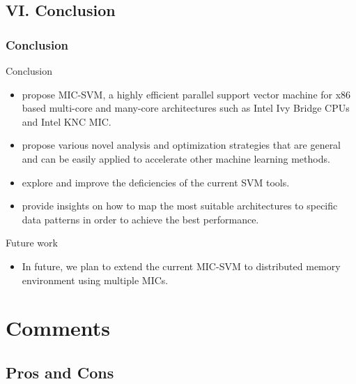 \documentclass{beamer}
\begin{document}
\subsection{VI. Conclusion} 
\begin{frame}
	\frametitle{Conclusion}	
	\begin{block}{Conclusion}
		\begin{itemize}
			\item propose MIC-SVM, a highly efficient parallel
			support vector machine for x86 based multi-core and many-core
			architectures such as Intel Ivy Bridge CPUs and Intel KNC MIC.
			\item propose various novel analysis and optimization strategies that
			are general and can be easily applied to accelerate other machine
			learning methods. 
			\item explore and improve the deficiencies of
			the current SVM tools. 
			\item provide insights on how to map the
			most suitable architectures to specific data patterns in order to achieve the best performance. 
		\end{itemize}		
	\end{block}
	\begin{block}{Future work}
		\begin{itemize}
			\item In future, we plan to extend the current MIC-SVM to distributed memory environment using multiple MICs. 
		
		\end{itemize}		
	\end{block}
	
\end{frame}

\section{Comments} %
\subsection{Pros and Cons} 
\end{document}
